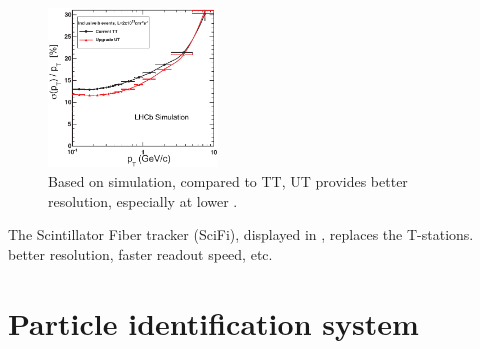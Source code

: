 \begin{figure}[!htb]
    \centering
    \includegraphics[width=0.4\textwidth]{./figs-lhcb-upgrade-overview/tracking/ut_pt_improvement.pdf}
    \caption{
        Based on simulation,
        compared to TT,
        UT provides better \pt resolution, especially at lower \pt.
    }
    \label{fig:ut-pt-improvement}
\end{figure}

The Scintillator Fiber tracker (SciFi), displayed in ,
replaces the T-stations.
better resolution, faster readout speed, etc.



\section{Particle identification system}
\label{ref:lhcb-upgrade-overview:pid}


